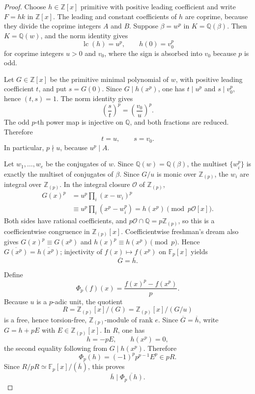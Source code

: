 \documentclass[11pt]{article}
\numberwithin{equation}{section}
\theoremstyle{definition}
\newcommand{\Q}{\mathbb Q}
\newcommand{\Z}{\mathbb Z}
\begin{document}
\begin{proof}
Choose \(h\in\Z[x]\) primitive with positive leading coefficient and write
\(F=hk\) in \(\Z[x]\).  The leading and constant coefficients of \(h\)
are coprime, because they divide the coprime integers \(A\) and \(B\).
Suppose \(\beta=w^p\) in \(K=\Q(\beta)\).  Then \(K=\Q(w)\), and the
norm identity gives
\[
 \operatorname{lc}(h)=u^p,\qquad h(0)=v_0^p
\]
for coprime integers \(u>0\) and \(v_0\), where the sign is absorbed into
\(v_0\) because \(p\) is odd.

Let \(G\in\Z[x]\) be the primitive minimal polynomial of \(w\), with
positive leading coefficient \(t\), and put \(s=G(0)\).  Since
\(G\mid h(x^p)\), one has \(t\mid u^p\) and \(s\mid v_0^p\), hence
\((t,s)=1\).  The norm identity gives
\[
 \left(\frac{s}{t}\right)^p
 =\left(\frac{v_0}{u}\right)^p.
\]
The odd \(p\)-th power map is injective on \(\Q\), and both fractions are
reduced.  Therefore
\[
 t=u,\qquad s=v_0.
\]
In particular, \(p\nmid u\), because \(u^p\mid A\).

Let \(w_1,\ldots,w_e\) be the conjugates of \(w\).  Since
\(\Q(w)=\Q(\beta)\), the multiset \(\{w_i^p\}\) is exactly the multiset
of conjugates of \(\beta\).  Since \(G/u\) is monic over
\(\Z_{(p)}\), the \(w_i\) are integral over \(\Z_{(p)}\).  In the
integral closure \(\mathcal O\) of \(\Z_{(p)}\),
\[
 \begin{aligned}
 G(x)^p
 &=u^p\prod_i(x-w_i)^p\\
 &\equiv u^p\prod_i(x^p-w_i^p)
 =h(x^p)\pmod {p\mathcal O[x]}.
 \end{aligned}
\]
Both sides have rational coefficients, and
\(p\mathcal O\cap\Q=p\Z_{(p)}\), so this is a coefficientwise congruence
in \(\Z_{(p)}[x]\).  Coefficientwise freshman's dream also gives
\(G(x)^p\equiv G(x^p)\) and
\(h(x)^p\equiv h(x^p)\pmod p\).  Hence
\(\overline{G(x^p)}=\overline{h(x^p)}\); injectivity of
\(f(x)\mapsto f(x^p)\) on \(\mathbb F_p[x]\) yields
\[
 \overline G=\overline h.
\]

Define
\[
 \Phi_p(f)(x)=\frac{f(x)^p-f(x^p)}p.
\]
Because \(u\) is a \(p\)-adic unit, the quotient
\[
 R=\Z_{(p)}[x]/(G)=\Z_{(p)}[x]/(G/u)
\]
is a free, hence torsion-free, \(\Z_{(p)}\)-module of rank \(e\).  Since \(\overline G=\overline h\), write
\(G=h+pE\) with \(E\in\Z_{(p)}[x]\).  In \(R\), one has
\[
 h=-pE,\qquad h(x^p)=0,
\]
the second equality following from \(G\mid h(x^p)\).  Therefore
\[
 \Phi_p(h)=(-1)^p p^{p-1}E^p\in pR.
\]
Since \(R/pR\simeq\mathbb F_p[x]/(\overline h)\), this proves
\[
 \overline h\mid\overline{\Phi_p(h)}.
\]


\end{proof}
\end{document}
